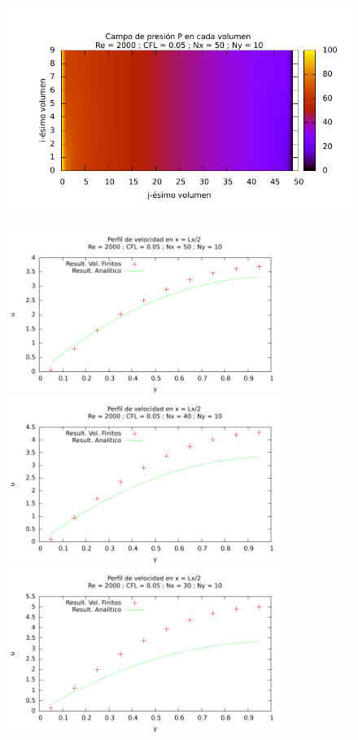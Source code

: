 \begin{figure} [H]
\centering
\includegraphics[width=1\textwidth]{./fig1_1/fig1_1/pressure_field.pdf}
\caption{} \label{fig_2}
\end{figure}

\begin{figure} [H]
\centering
\includegraphics[width=0.8\textwidth]{./fig1_1/fig1_1/velocity_profile.pdf}
\includegraphics[width=0.8\textwidth]{./fig1_1/fig1_2/velocity_profile.pdf}
\includegraphics[width=0.8\textwidth]{./fig1_1/fig1_3/velocity_profile.pdf}
\caption{} \label{fig_3}
\end{figure}

